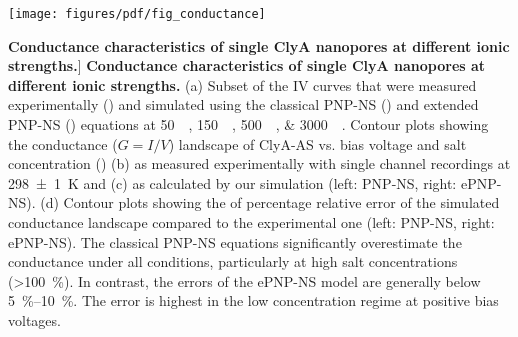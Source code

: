 \begin{figure*}[htbp]
	
	\centering
	
	\texttt{[image: figures/pdf/fig\_conductance]}
	
	\caption
	[\textbf{Conductance characteristics of single ClyA nanopores at different ionic strengths.}]
	{
		\textbf{Conductance characteristics of single ClyA nanopores at different ionic strengths.}
		(a) Subset of the IV curves that were measured experimentally () and simulated using the classical PNP-NS () and extended PNP-NS () equations  at \SIlist[list-units=single]{50;150;500;3000}{\milli\Molar}.
		Contour plots showing the conductance ($G = I/V$) landscape of ClyA-AS vs. bias voltage and salt concentration () (b) as measured experimentally with single channel recordings at \SI{298(1)}{\kelvin} and 
		(c) as calculated by our simulation (left: PNP-NS, right: ePNP-NS).
		(d) Contour plots showing the of percentage relative error of the simulated conductance landscape compared to the experimental one (left: PNP-NS, right: ePNP-NS).
		The classical PNP-NS equations significantly overestimate the conductance under all conditions, particularly at high salt concentrations (\SI{>100}{\percent}).
		In contrast, the errors of the ePNP-NS model are generally below \SIrange{5}{10}{\percent}.
		The error is highest in the low concentration regime at positive bias voltages.
	}
	
	\label{fig:conductance}
	
\end{figure*}